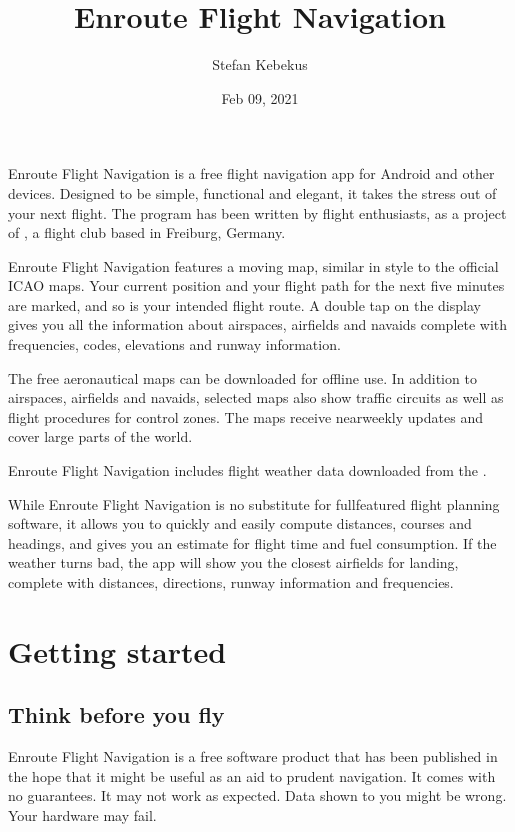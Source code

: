 \documentclass[letterpaper,10pt,english]{sphinxmanual}
\title{Enroute Flight Navigation}
\date{Feb 09, 2021}
\author{Stefan Kebekus}
\let\sphinxpxdimen\pdfpxdimen\else\newdimen\sphinxpxdimen
\begin{document}
\pagestyle{empty}
\sphinxmaketitle
\pagestyle{plain}
\sphinxtableofcontents
\pagestyle{normal}
\label{\detokenize{index::doc}}


\noindent{\hspace*{\fill}\sphinxincludegraphics[width=100\sphinxpxdimen]{{de.akaflieg_freiburg.enroute}.png}\hspace*{\fill}}

Enroute Flight Navigation is a free flight navigation app for Android and other
devices. Designed to be simple, functional and elegant, it takes the stress out
of your next flight. The program has been written by flight enthusiasts, as a
project of , a flight club
based in Freiburg, Germany.

Enroute Flight Navigation features a moving map, similar in style to the
official ICAO maps. Your current position and your flight path for the next five
minutes are marked, and so is your intended flight route. A double tap on the
display gives you all the information about airspaces, airfields and navaids \textendash{}
complete with frequencies, codes, elevations and runway information.

The free aeronautical maps can be downloaded for offline use. In addition to
airspaces, airfields and navaids, selected maps also show traffic circuits as
well as flight procedures for control zones. The maps receive near\sphinxhyphen{}weekly
updates and cover large parts of the world.

Enroute Flight Navigation includes flight weather data downloaded from the
.

While Enroute Flight Navigation is no substitute for full\sphinxhyphen{}featured flight
planning software, it allows you to quickly and easily compute distances,
courses and headings, and gives you an estimate for flight time and fuel
consumption. If the weather turns bad, the app will show you the closest
airfields for landing, complete with distances, directions, runway information
and frequencies.

\part{Getting started}


\chapter{Think before you fly}
\label{\detokenize{01-intro/think:think-before-you-fly}}\label{\detokenize{01-intro/think::doc}}
Enroute Flight Navigation is a free software product that has been published in
the hope that it might be useful as an aid to prudent navigation.  It comes with
no guarantees.  It may not work as expected.  Data shown to you might be wrong.
Your hardware may fail.
\end{document}
